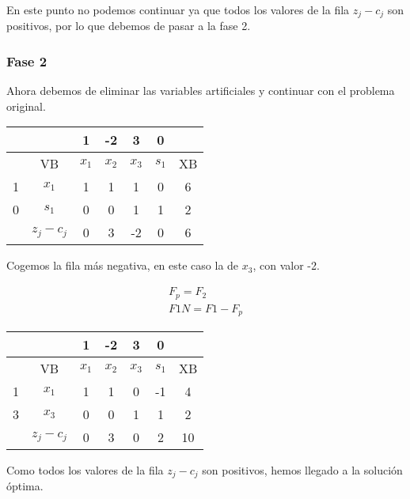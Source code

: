 \begin{itemize}
    En este punto no podemos continuar ya que todos los valores de la fila $z_j - c_j$ son positivos, por lo que debemos de pasar a la fase 2.

    \subsubsection*{Fase 2}

    Ahora debemos de eliminar las variables artificiales y continuar con el problema original.

    \begin{table}[H]
        \centering
        \begin{tabular}{|c|c|c|c|c|c|c|}
        \hline
        &  & 1 & -2 & 3 & 0 &\\
        \hline
        & VB & $x_1$ & $x_2$ & $x_3$ & $s_1$ & XB \\
        \hline
        1 & $x_1$ & 1 & 1 & 1 & 0 & 6\\
        \hline
        0 & $s_1$ & 0 & 0 & 1 & 1& 2\\
        \hline
        & $z_j - c_j$ & 0 & 3&-2 & 0 & 6\\
        \hline
        \end{tabular}
    \end{table}

    Cogemos la fila más negativa, en este caso la de $x_3$, con valor -2.

    \begin{align*}
        F_p = F_2\\
        F1N = F1 - F_p
    \end{align*}

    \begin{table}[H]
        \centering
        \begin{tabular}{|c|c|c|c|c|c|c|}
        \hline
        &  & 1 & -2 & 3 & 0 &\\
        \hline
        & VB & $x_1$ & $x_2$ & $x_3$ & $s_1$ & XB \\
        \hline
        1 & $x_1$ & 1 & 1 & 0 & -1 & 4\\
        \hline
        3 & $x_3$ & 0 & 0 & 1 & 1& 2\\
        \hline
        & $z_j - c_j$ & 0 & 3&0 & 2 & 10\\
        \hline
        \end{tabular}
    \end{table}

    Como todos los valores de la fila $z_j - c_j$ son positivos, hemos llegado a la solución óptima.



\end{itemize}
